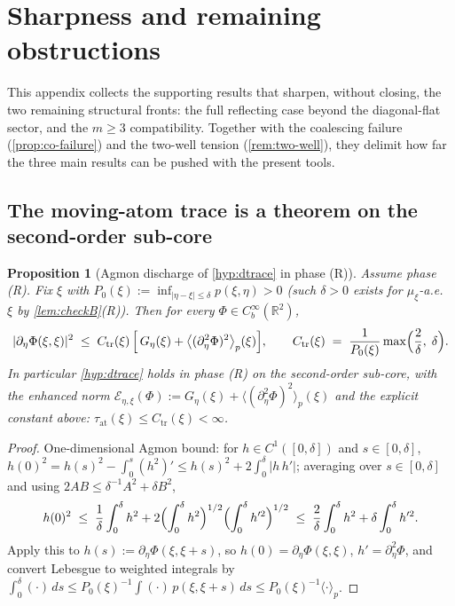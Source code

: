 \documentclass[reqno,final,11pt]{amsart}
\theoremstyle{plain}
\newtheorem{proposition}[theorem]{Proposition}
\theoremstyle{definition}
\theoremstyle{remark}
\newcommand{\R}{\mathbb R}
\begin{document}
\section{Sharpness and remaining obstructions}\label{sec:sharpness}

This appendix collects the supporting results that sharpen, without closing,
the two remaining structural fronts: the full reflecting case beyond the
diagonal-flat sector, and the $m\ge3$ compatibility. Together with the coalescing failure (\cref{prop:co-failure}) and the two-well
tension (\cref{rem:two-well}), they delimit how far the three main results can
be pushed with the present tools.

\subsection{The moving-atom trace is a theorem on the second-order sub-core}

\begin{proposition}[Agmon discharge of \cref{hyp:dtrace} in phase (R)]\label{prop:agmon}
Assume phase \textnormal{(R)}. Fix $\xi$ with
$P_0(\xi):=\inf_{|\eta-\xi|\le\delta}p(\xi,\eta)>0$ (such $\delta>0$ exists for
$\mu_\xi$-a.e.\ $\xi$ by \cref{lem:checkB}\textnormal{(R)}). Then for every
$\Phi\in C_b^\infty(\R^2)$,
\[
  |\partial_\eta\Phi(\xi,\xi)|^2\;\le\;
  C_{\mathrm{tr}}(\xi)\,\Bigl[\,G_\eta(\xi)
  +\bigl\langle(\partial_\eta^2\Phi)^2\bigr\rangle_p(\xi)\Bigr],
  \qquad
  C_{\mathrm{tr}}(\xi)\;=\;\frac{1}{P_0(\xi)}\max\Bigl(\frac2\delta,\;\delta\Bigr).
\]
In particular \cref{hyp:dtrace} holds in phase \textnormal{(R)} on the
second-order sub-core, with the enhanced norm
$\mathcal E_{\eta,\xi}(\Phi):=G_\eta(\xi)+\langle(\partial_\eta^2\Phi)^2\rangle_p(\xi)$
and the explicit constant above: $\tau_{\mathrm{at}}(\xi)\le C_{\mathrm{tr}}(\xi)<\infty$.
\end{proposition}
\begin{proof}
One-dimensional Agmon bound: for $h\in C^1([0,\delta])$ and $s\in[0,\delta]$,
$h(0)^2=h(s)^2-\int_0^s(h^2)'\le h(s)^2+2\int_0^\delta|h\,h'|$; averaging over
$s\in[0,\delta]$ and using $2AB\le\delta^{-1}A^2+\delta B^2$,
\[
  h(0)^2\;\le\;\frac1\delta\int_0^\delta h^2
  +2\Bigl(\int_0^\delta h^2\Bigr)^{1/2}\Bigl(\int_0^\delta h'^2\Bigr)^{1/2}
  \;\le\;\frac2\delta\int_0^\delta h^2+\delta\int_0^\delta h'^2 .
\]
Apply this to $h(s):=\partial_\eta\Phi(\xi,\xi+s)$, so $h(0)=\partial_\eta\Phi(\xi,\xi)$,
$h'=\partial_\eta^2\Phi$, and convert Lebesgue to weighted integrals by
$\int_0^\delta(\cdot)\,ds\le P_0(\xi)^{-1}\int(\cdot)\,p(\xi,\xi+s)\,ds
\le P_0(\xi)^{-1}\langle\cdot\rangle_p$.
\end{proof}
\end{document}
